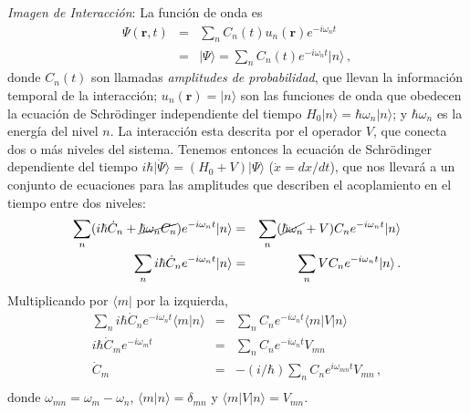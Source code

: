 \documentclass[twocolumn,aps,eqsecnum]{revtex4}
\newcommand{\mbr}{\mathbf{r}}
\providecommand{\bra}[1]{\langle #1 \rvert}
\providecommand{\ket}[1]{\lvert #1 \rangle}
\providecommand{\braket}[2]{\langle #1 \rvert #2 \rangle}
\begin{document}
\textit{Imagen de Interacci\'on}: La funci\'on de onda es 
%
\begin{eqnarray} 
\Psi(\mbr,t) &=& \sum_n C_n (t) u_n (\mbr) e^{-i \omega_n t} \nonumber \\ 
&=& \ket{\Psi} = \sum_n C_n (t)  e^{-i \omega_n t} \ket{n} \,, 
\end{eqnarray}
donde $C_n (t)$ son llamadas \textit{amplitudes de probabilidad}, que llevan 
la informaci\'on temporal de la interacci\'on; $u_n (\mbr) = \ket{n}$ son las 
funciones de onda que obedecen la ecuaci\'on de Schr\"odinger independiente 
del tiempo $H_0 \ket{n} = \hbar \omega_n \ket{n}$; y $\hbar \omega_n$ es la 
energ\'ia del nivel $n$. La interacci\'on esta descrita por el operador $V$, que 
conecta dos o m\'as niveles del sistema. Tenemos entonces la ecuaci\'on de 
Schr\"odinger dependiente del tiempo 
$i \hbar \ket{\dot{\Psi}} =  (H_0 +V) \ket{\Psi}$ ($\dot{x} = dx/dt $), 
que nos llevar\'a a un conjunto de ecuaciones para las amplitudes que describen el acoplamiento en el tiempo entre dos niveles:   
%
\begin{eqnarray} 
\sum_n ( i \hbar \dot{C}_n + \cancel{\hbar \omega_n C_n} ) 
	e^{-i \omega_n t} \ket{n} 
	&=& \sum_n ( \cancel{\hbar \omega_n} +V) C_n 
	e^{-i \omega_n t} \ket{n} 	\nonumber \\ 
\sum_n i \hbar \dot{C}_n  e^{-i \omega_n t} \ket{n} 
	&=& \sum_n V C_n e^{-i \omega_n t} \ket{n} \,.
\end{eqnarray}
Multiplicando por $\bra{m}$ por la izquierda,  
%
\begin{eqnarray} 	\label{eq:amplitudeEqsIP}
\sum_n i \hbar \dot{C}_n  e^{-i \omega_n t}  \braket{m}{n} 
	&=& \sum_n C_n e^{-i \omega_n t}  \bra{m} V \ket{n} 	\nonumber \\ 
i \hbar \dot{C}_m  e^{-i \omega_m t}  
	&=& \sum_n C_n e^{-i \omega_n t} V_{mn} 	\nonumber \\ 
\dot{C}_m &=& - (i/\hbar) \sum_n C_n e^{i \omega_{mn} t} V_{mn} \,,
	\nonumber \\
\end{eqnarray}
donde $\omega_{mn} = \omega_m - \omega_n$, 
$\braket{m}{n} = \delta_{mn}$ y $ \bra{m} V \ket{n} = V_{mn}$. 
\end{document}
